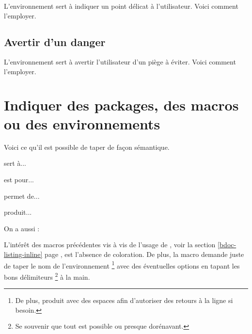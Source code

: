 L'environnement  sert à indiquer un point délicat à  l'utilisateur. Voici comment l'employer.




\subsection{Avertir d'un danger}

L'environnement  sert à avertir l'utilisateur d'un piège à éviter. Voici comment l'employer.



\section{Indiquer des packages, des macros ou des environnements}

Voici ce qu'il est possible de taper de façon sémantique.

\begin{bdoclatex}[sbs]
 sert à...

 est pour...

 permet de...

 produit...

On a aussi :

\end{bdoclatex}


\begin{bdocrem}
    L'intérêt des macros précédentes vis à vis de l'usage de , voir la section \ref{bdoc-listing-inline} page \pageref{bdoc-listing-inline}, est l'absence de coloration.
    De plus, la macro  demande juste de taper le nom de l'environnement
    \footnote{
        De plus,  produit  avec des espaces afin d'autoriser des retours à la ligne si besoin.
    }
    avec des éventuelles options en tapant les bons délimiteurs
    \footnote{
        Se souvenir que tout est possible ou presque dorénavant.
    }
    à la main.
\end{bdocrem}


